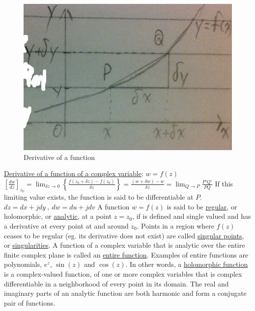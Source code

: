 \documentclass[12pt]{article}
\begin{document}
\begin{flushleft}
	\begin{figure}[H] 
	\centering
	\includegraphics[scale=0.4]{complexAnalysisRealDerivative}
	\caption{Derivative of a function}
	\label{fig:complexAnalysisRealDerivative}
	\end{figure}
	
	\textbullet \quad \uline{Derivative of a function of a complex variable}: $w=f(z)$ \linebreak 
	$\displaystyle \left[ \frac{dw}{dz} \right]_{z_0} = \lim_{\delta z \to 0} \left\{ \frac{f(z_0 + \delta z) - f(z_0)}{\delta z} \right\} = \frac{(w+\delta w) - w}{\delta z} = \lim_{Q\to P} \frac{P'Q'}{PQ}$ \linebreak 
	If this limiting value exists, the function is said to be differentiable at $P$. \linebreak 
	\textbullet \quad $dz = dx + j dy \ , \ dw = du + j dv$ \linebreak 
	\textbullet \quad A function $w=f(z)$ is said to be \uline{regular}, or holomorphic, or \uline{analytic}, at a point $z=z_0$, if is defined and single valued and has a derivative at every point at and around $z_0$. Points in a region where $f(z)$ ceases to be regular (eg. its derivative does not exist) are called \uline{singular points}, or \uline{singularities}. A function of a complex variable that is analytic over the entire finite complex plane is called an \uline{entire function}. Examples of entire functions are polynomials, $e^z$, $\sin (z)$ and $\cos (z)$. \linebreak 	
	In other words, a \uline{holomorphic function} is a complex-valued function, of one or more complex variables that is complex differentiable in a neighborhood of every point in its domain. \linebreak 
	\textbullet \quad The real and imaginary parts of an analytic function are both harmonic and form a conjugate pair of functions. \linebreak 
	

\end{flushleft}
\end{document}
